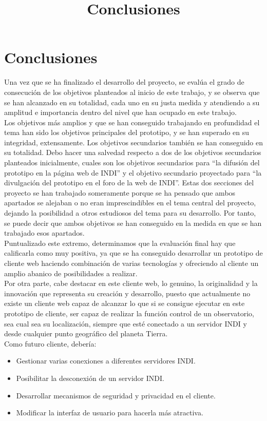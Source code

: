 \chapter{Conclusiones}
\title{Conclusiones}
\label{cap:Conclusiones}

Una vez que se ha finalizado el desarrollo del proyecto, se evalúa el grado de consecución de los objetivos planteados  al inicio de este trabajo, y se observa que se han alcanzado en su totalidad, cada uno en su justa medida y atendiendo a su amplitud e importancia dentro del nivel que han ocupado en este trabajo. \\

Los objetivos más amplios y que se han conseguido trabajando en profundidad el tema han sido los objetivos principales del prototipo, y se han superado en su integridad, extensamente.
Los objetivos secundarios también se han conseguido en su totalidad. Debo hacer una salvedad respecto a dos de los objetivos secundarios planteados inicialmente, cuales son los objetivos secundarios para “la difusión del prototipo en la página web de INDI” y el objetivo secundario proyectado para “la divulgación del prototipo en el foro de la web de INDI”. Estas dos secciones del proyecto se han trabajado someramente porque se ha pensado que ambos apartados se alejaban o no eran imprescindibles en el tema central del proyecto, dejando la posibilidad a otros estudiosos del tema para su desarrollo. Por tanto, se puede decir que ambos objetivos se han conseguido en la medida en que se han trabajado esos apartados.\\

Puntualizado este extremo, determinamos que la evaluación final hay que calificarla como muy positiva, ya que se ha conseguido desarrollar un prototipo de cliente web haciendo combinación de varias tecnologías y ofreciendo al cliente un amplio abanico de posibilidades a realizar.\\

Por otra parte, cabe destacar en este cliente web, lo genuino, la originalidad y la innovación que representa su creación y desarrollo, puesto que actualmente no existe un cliente web capaz de alcanzar lo que si se consigue ejecutar en este prototipo de cliente, ser  capaz de realizar la función control de un observatorio, sea cual sea su localización, siempre que esté conectado a un servidor INDI y desde cualquier punto geográfico del planeta Tierra.\\

Como futuro cliente, debería:
\begin{itemize}
  \item Gestionar varias conexiones a diferentes servidores INDI.
  \item Posibilitar la desconexión de un servidor INDI.
  \item Desarrollar mecanismos de seguridad y privacidad en el cliente.
  \item Modificar la interfaz de usuario para hacerla más atractiva.
\end{itemize}
